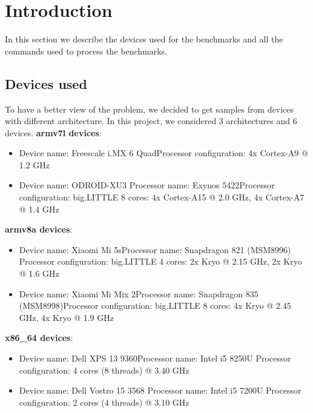 \section{Introduction}

In this section we describe the devices used for the benchmarks and all the commands used to process the benchmarks.

\subsection{Devices used}

To have a better view of the problem, we decided to get samples from devices with different architecture.
In this project, we considered 3 architectures and 6 devices.\newline 
\textbf{armv7l devices}:
\begin{itemize}
	\item Device name: Freescale i.MX 6 Quad\newline Processor configuration: 4x Cortex-A9 @ 1.2 GHz
	\item Device name: ODROID-XU3 \newline Processor name: Exynos 5422\newline Processor configuration: big.LITTLE 8 cores: 4x Cortex-A15 @ 2.0 GHz, 4x Cortex-A7 @ 1.4 GHz 
\end{itemize}
\textbf{armv8a devices}:
\begin{itemize}
	\item Device name: Xiaomi Mi 5s\newline Processor name: Snapdragon 821 (MSM8996) \newline Processor configuration: big.LITTLE 4 cores: 2x Kryo @ 2.15 GHz, 2x Kryo @ 1.6 GHz
	\item Device name: Xiaomi Mi Mix 2\newline Processor name: Snapdragon 835 (MSM8998)\newline Processor configuration: big.LITTLE 8 cores: 4x Kryo @ 2.45 GHz, 4x Kryo @ 1.9 GHz
\end{itemize}
\textbf{x86\_64 devices}:
\begin{itemize}
	\item Device name: Dell XPS 13 9360\newline Processor name: Intel i5 8250U \newline Processor configuration: 4 cores (8 threads) @ 3.40 GHz
	\item Device name: Dell Vostro 15 3568 \newline Processor name: Intel i5 7200U
	\newline Processor configuration: 2 cores (4 threads) @ 3.10 GHz
\end{itemize}
\clearpage
